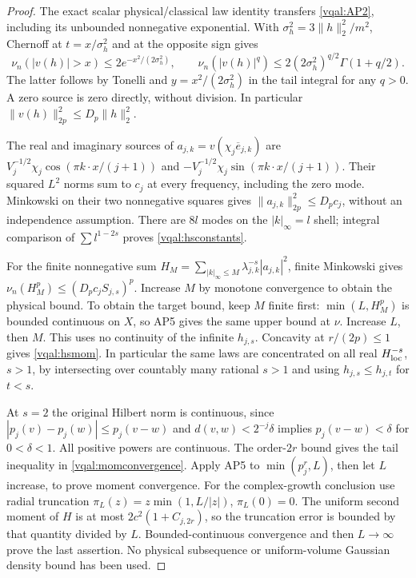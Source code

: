 \documentclass[11pt]{article}
\theoremstyle{plain}
\theoremstyle{definition}
\theoremstyle{remark}
\begin{document}
\begin{proof}
The exact scalar physical/classical law identity transfers
\eqref{vqal:AP2}, including its unbounded nonnegative exponential.
With $\sigma_h^2=3\|h\|_2^2/m^2$, Chernoff at $t=x/\sigma_h^2$ and
at the opposite sign gives
\begin{equation}\label{vqal:scalar-mom}
 \nu_n(|v(h)|>x)\le2e^{-x^2/(2\sigma_h^2)},\qquad
 \nu_n(|v(h)|^q)\le2(2\sigma_h^2)^{q/2}\Gamma(1+q/2).
\end{equation}
The latter follows by Tonelli and $y=x^2/(2\sigma_h^2)$ in the tail
integral for any $q>0$. A zero source is zero directly, without division.
In particular $\|v(h)\|_{2p}^2\le D_p\|h\|_2^2$.

The real and imaginary sources of $a_{j,k}=v(\chi_j\overline e_{j,k})$
are $V_j^{-1/2}\chi_j\cos(\pi k\cdot x/(j+1))$ and
$-V_j^{-1/2}\chi_j\sin(\pi k\cdot x/(j+1))$. Their squared $L^2$
norms sum to $c_j$ at every frequency, including the zero mode.
Minkowski on their two nonnegative squares gives
$\|a_{j,k}\|_{2p}^2\le D_pc_j$, without an independence assumption.
There are $8l$ modes on the $|k|_\infty=l$ shell; integral comparison of
$\sum l^{1-2s}$ proves \eqref{vqal:hsconstants}.

For the finite nonnegative sum $H_M=\sum_{|k|_\infty\le M}
\lambda_{j,k}^{-s}|a_{j,k}|^2$, finite Minkowski gives
$\nu_n(H_M^p)\le(D_pc_jS_{j,s})^p$. Increase $M$ by monotone
convergence to obtain the physical bound. To obtain the target bound,
keep $M$ finite first: $\min(L,H_M^p)$ is bounded continuous on $X$,
so AP5 gives the same upper bound at $\nu$. Increase $L$, then $M$.
This uses no continuity of the infinite $h_{j,s}$. Concavity at
$r/(2p)\le1$ gives \eqref{vqal:hsmom}. In particular the same laws are
concentrated on all real $H^{-s}_{\rm loc}$, $s>1$, by intersecting over
countably many rational $s>1$ and using $h_{j,s}\le h_{j,t}$ for $t<s$.

At $s=2$ the original Hilbert norm is continuous, since
$|p_j(v)-p_j(w)|\le p_j(v-w)$ and
$d(v,w)<2^{-j}\delta$ implies $p_j(v-w)<\delta$ for $0<\delta<1$.
All positive powers are continuous. The order-$2r$ bound gives the tail
inequality in \eqref{vqal:momconvergence}. Apply AP5 to
$\min(p_j^r,L)$, then let $L$ increase, to prove moment convergence.
For the complex-growth conclusion use radial truncation
$\pi_L(z)=z\min(1,L/|z|)$, $\pi_L(0)=0$.
The uniform second moment of $H$ is at most
$2c^2(1+C_{j,2r})$, so the truncation error is bounded by that quantity
divided by $L$. Bounded-continuous convergence and then $L\to\infty$
prove the last assertion. No physical subsequence or uniform-volume
Gaussian density bound has been used.
\end{proof}
\end{document}
